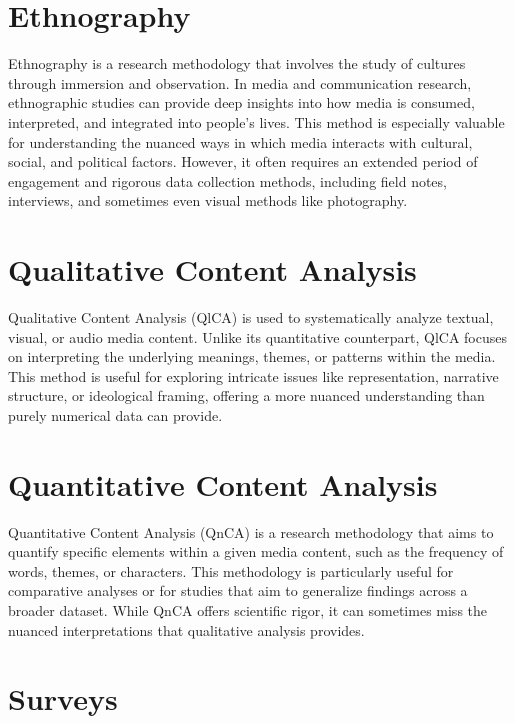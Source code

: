 \documentclass[
  b5paper]{book}
\begin{document}
\hypertarget{ethnography}{%
\section*{Ethnography}\label{ethnography}}

Ethnography is a research methodology that involves the study of cultures through immersion and observation. In media and communication research, ethnographic studies can provide deep insights into how media is consumed, interpreted, and integrated into people's lives. This method is especially valuable for understanding the nuanced ways in which media interacts with cultural, social, and political factors. However, it often requires an extended period of engagement and rigorous data collection methods, including field notes, interviews, and sometimes even visual methods like photography.

\hypertarget{qualitative-content-analysis}{%
\section*{Qualitative Content Analysis}\label{qualitative-content-analysis}}

Qualitative Content Analysis (QlCA) is used to systematically analyze textual, visual, or audio media content. Unlike its quantitative counterpart, QlCA focuses on interpreting the underlying meanings, themes, or patterns within the media. This method is useful for exploring intricate issues like representation, narrative structure, or ideological framing, offering a more nuanced understanding than purely numerical data can provide.

\hypertarget{quantitative-content-analysis}{%
\section*{Quantitative Content Analysis}\label{quantitative-content-analysis}}

Quantitative Content Analysis (QnCA) is a research methodology that aims to quantify specific elements within a given media content, such as the frequency of words, themes, or characters. This methodology is particularly useful for comparative analyses or for studies that aim to generalize findings across a broader dataset. While QnCA offers scientific rigor, it can sometimes miss the nuanced interpretations that qualitative analysis provides.

\hypertarget{surveys}{%
\section*{Surveys}\label{surveys}}
\end{document}

